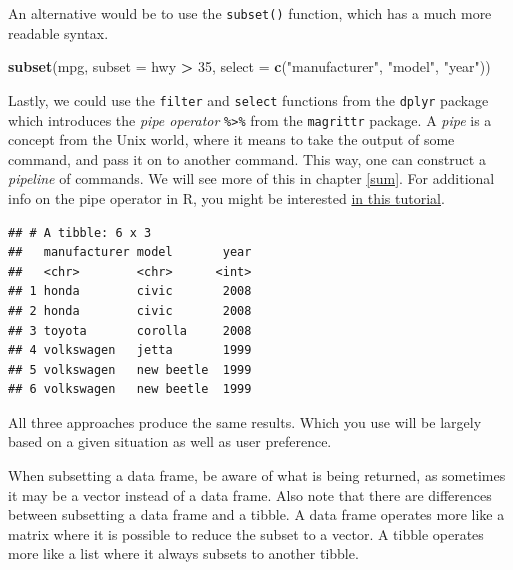 \documentclass[]{book}
\newenvironment{Shaded}{\begin{snugshade}}{\end{snugshade}}
\newcommand{\KeywordTok}[1]{\textcolor[rgb]{0.13,0.29,0.53}{\textbf{#1}}}
\newcommand{\DataTypeTok}[1]{\textcolor[rgb]{0.13,0.29,0.53}{#1}}
\newcommand{\DecValTok}[1]{\textcolor[rgb]{0.00,0.00,0.81}{#1}}
\newcommand{\StringTok}[1]{\textcolor[rgb]{0.31,0.60,0.02}{#1}}
\newcommand{\OperatorTok}[1]{\textcolor[rgb]{0.81,0.36,0.00}{\textbf{#1}}}
\newcommand{\NormalTok}[1]{#1}
\theoremstyle{definition}
\theoremstyle{definition}
\theoremstyle{definition}
\theoremstyle{remark}
\begin{document}
An alternative would be to use the \texttt{subset()} function, which has
a much more readable syntax.

\begin{Shaded}
\begin{Highlighting}[]
\KeywordTok{subset}\NormalTok{(mpg, }\DataTypeTok{subset =}\NormalTok{ hwy }\OperatorTok{>}\StringTok{ }\DecValTok{35}\NormalTok{, }\DataTypeTok{select =} \KeywordTok{c}\NormalTok{(}\StringTok{"manufacturer"}\NormalTok{, }\StringTok{"model"}\NormalTok{, }\StringTok{"year"}\NormalTok{))}
\end{Highlighting}
\end{Shaded}

Lastly, we could use the \texttt{filter} and \texttt{select} functions
from the \texttt{dplyr} package which introduces the \emph{pipe
operator} \texttt{\%\textgreater{}\%} from the \texttt{magrittr}
package. A \emph{pipe} is a concept from the Unix world, where it means
to take the output of some command, and pass it on to another command.
This way, one can construct a \emph{pipeline} of commands. We will see
more of this in chapter \ref{sum}. For additional info on the pipe
operator in R, you might be interested
\href{https://www.datacamp.com/community/tutorials/pipe-r-tutorial}{in
this tutorial}.

\begin{Shaded}
\end{Shaded}

\begin{verbatim}
## # A tibble: 6 x 3
##   manufacturer model       year
##   <chr>        <chr>      <int>
## 1 honda        civic       2008
## 2 honda        civic       2008
## 3 toyota       corolla     2008
## 4 volkswagen   jetta       1999
## 5 volkswagen   new beetle  1999
## 6 volkswagen   new beetle  1999
\end{verbatim}

All three approaches produce the same results. Which you use will be
largely based on a given situation as well as user preference.

When subsetting a data frame, be aware of what is being returned, as
sometimes it may be a vector instead of a data frame. Also note that
there are differences between subsetting a data frame and a tibble. A
data frame operates more like a matrix where it is possible to reduce
the subset to a vector. A tibble operates more like a list where it
always subsets to another tibble.
\end{document}
